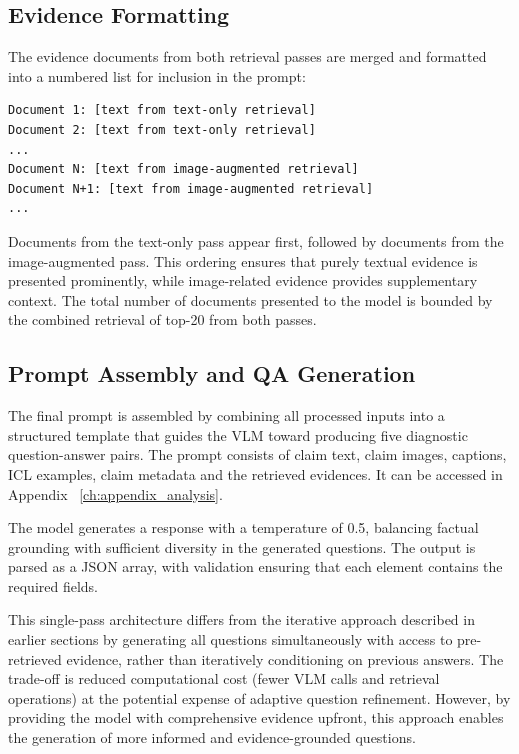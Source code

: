\subsection{Evidence Formatting}

The evidence documents from both retrieval passes are merged and formatted into a numbered list for inclusion in the prompt:

\begin{verbatim}
Document 1: [text from text-only retrieval]
Document 2: [text from text-only retrieval]
...
Document N: [text from image-augmented retrieval]
Document N+1: [text from image-augmented retrieval]
...
\end{verbatim}

Documents from the text-only pass appear first, followed by documents from the image-augmented pass. This ordering ensures that purely textual evidence is presented prominently, while image-related evidence provides supplementary context. The total number of documents presented to the model is bounded by the combined retrieval of top-20 from both passes.

\subsection{Prompt Assembly and QA Generation}

The final prompt is assembled by combining all processed inputs into a structured template that guides the VLM toward producing five diagnostic question-answer pairs. The prompt consists of claim text, claim images, captions, ICL examples, claim metadata and the retrieved evidences. It can be accessed in Appendix ~\ref{ch:appendix_analysis}.

The model generates a response with a temperature of 0.5, balancing factual grounding with sufficient diversity in the generated questions. The output is parsed as a JSON array, with validation ensuring that each element contains the required fields.

This single-pass architecture differs from the iterative approach described in earlier sections by generating all questions simultaneously with access to pre-retrieved evidence, rather than iteratively conditioning on previous answers. The trade-off is reduced computational cost (fewer VLM calls and retrieval operations) at the potential expense of adaptive question refinement. However, by providing the model with comprehensive evidence upfront, this approach enables the generation of more informed and evidence-grounded questions.

